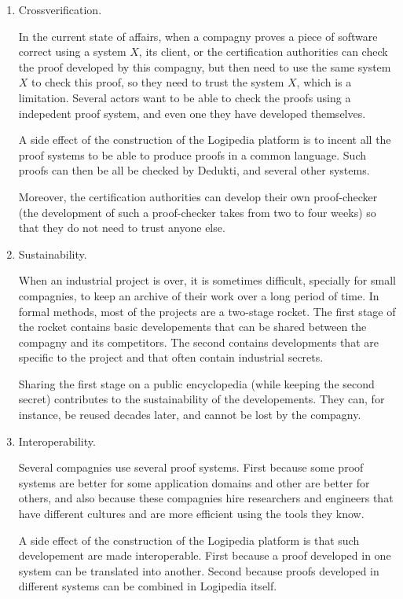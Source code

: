 \begin{enumerate}
\item Crossverification.

In the current state of affairs, when a compagny proves a piece of
software correct using a system $X$, its client, or the certification
authorities can check the proof developed by this compagny, but then
need to use the same system $X$ to check this proof, so they need to
trust the system $X$, which is a limitation. Several actors want to be
able to check the proofs using a indepedent proof system, and even one
they have developed themselves.

A side effect of the construction of the {\sc Logipedia} platform is
to incent all the proof systems to be able to produce proofs in a
common language. Such proofs can then be all be checked by {\sc
Dedukti}, and several other systems.

Moreover, the certification authorities can develop their own
proof-checker (the development of such a proof-checker takes from two
to four weeks) so that they do not need to trust anyone else.

\item Sustainability.

When an industrial project is over, it is sometimes difficult,
specially for small compagnies, to keep an archive of their work over
a long period of time. In formal methods, most of the projects are a
two-stage rocket. The first stage of the rocket contains basic
developements that can be shared between the compagny and its
competitors. The second contains developments that are specific to the
project and that often contain industrial secrets.

Sharing the first stage on a public encyclopedia (while keeping the
second secret) contributes to the sustainability of the
developements. They can, for instance, be reused decades later, and
cannot be lost by the compagny.

\item Interoperability.

Several compagnies use several proof systems. First because some proof
systems are better for some application domains and other are better
for others, and also because these compagnies hire researchers and
engineers that have different cultures and are more efficient using the
tools they know.

A side effect of the construction of the {\sc Logipedia} platform is
that such developement are made interoperable. First because a proof
developed in one system can be translated into another. Second because
proofs developed in different systems can be combined in {\sc
Logipedia} itself.
\end{enumerate}

